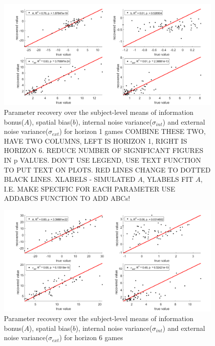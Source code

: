 \documentclass[12pt]{article}
\begin{document}
	\begin{figure}[h]
		\begin{center}
			\includegraphics[width=1\textwidth]{figures/paramrecover_1.png}
			\caption{Parameter recovery over the subject-level means of information bonus($A$), spatial bias($b$), internal noise variance($\sigma_{int}$) and external noise variance($\sigma_{ext}$) for horizon 1 games
			COMBINE THESE TWO, HAVE TWO COLUMNS, LEFT IS HORIZON 1, RIGHT IS HORIZON 6.  REDUCE NUMBER OF SIGNIFICANT FIGURES IN p VALUES.  DON'T USE LEGEND, USE TEXT FUNCTION TO PUT TEXT ON PLOTS.  RED LINES CHANGE TO DOTTED BLACK LINES.  
			XLABELS - SIMULATED $A$, YLABELS FIT $A$, I.E. MAKE SPECIFIC FOR EACH PARAMETER
			USE ADDABCS FUNCTION TO ADD ABCs!
			}
			\label{fig:pararecover1}
		\end{center}
	\end{figure} 
	
	\begin{figure}[H]
		\begin{center}
			\includegraphics[width=1\textwidth]{figures/paramrecover_2.png}
			\caption{Parameter recovery over the subject-level means of information bonus($A$), spatial bias($b$), internal noise variance($\sigma_{int}$) and external noise variance($\sigma_{ext}$) for horizon 6 games}
			\label{fig:pararecover2}
		\end{center}
	\end{figure}
	
\end{document}
